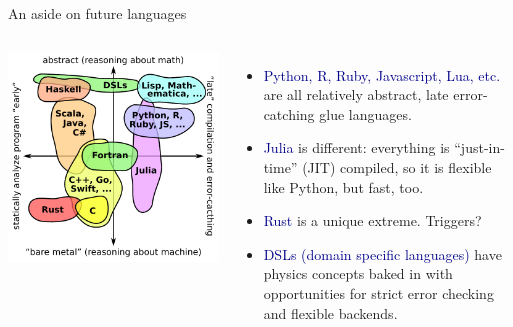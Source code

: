 \documentclass[aspectratio=169]{beamer}
\begin{document}
\begin{frame}{An aside on future languages}
\vspace{0.5 cm}
\begin{columns}
\includegraphics[width=\linewidth]{img/language-properties-grid.pdf}

\begin{itemize}
\item \textcolor{darkblue}{Python, R, Ruby, Javascript, Lua, etc.} are all relatively abstract, late error-catching glue languages. \\ 

\item<3-> \textcolor{darkblue}{Julia} is different: everything is ``just-in-time'' (JIT) compiled, so it is flexible like Python, but fast, too.

\item<4-> \textcolor{darkblue}{Rust} is a unique extreme. Triggers?

\item<5-> \textcolor{darkblue}{DSLs (domain specific languages)} have physics concepts baked in with opportunities for strict error checking and flexible backends.

\end{itemize}
\end{columns}
\end{frame}
\end{document}
